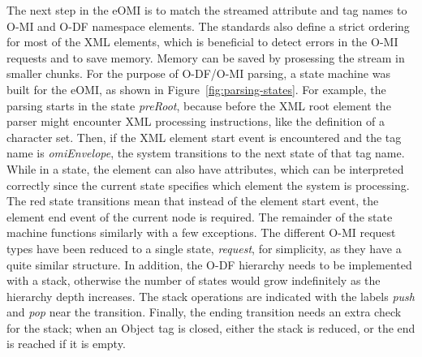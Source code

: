The next step in the eOMI is to match the streamed attribute and tag names to O-MI and O-DF namespace elements. The standards also define a strict ordering for most of the XML elements, which is beneficial to detect errors in the O-MI requests and to save memory. Memory can be saved by prosessing the stream in smaller chunks. For the purpose of O-DF/O-MI parsing, a state machine was built for the eOMI, as shown in Figure~\ref{fig:parsing-states}. For example, the parsing starts in the state \emph{preRoot}, because before the XML root element the parser might encounter XML processing instructions, like the definition of a character set. Then, if the XML element start event is encountered and the tag name is \emph{omiEnvelope}, the system transitions to the next state of that tag name. While in a state, the element can also have attributes, which can be interpreted correctly since the current state specifies which element the system is processing. The red state transitions mean that instead of the element start event, the element end event of the current node is required. The remainder of the state machine functions similarly with a few exceptions. The different O-MI request types have been reduced to a single state, \emph{request}, for simplicity, as they have a quite similar structure. In addition, the O-DF hierarchy needs to be implemented with a stack, otherwise the number of states would grow indefinitely as the hierarchy depth increases. The stack operations are indicated with the labels \emph{push} and \emph{pop} near the transition. Finally, the ending transition needs an extra check for the stack; when an Object tag is closed, either the stack is reduced, or the end is reached if it is empty.


